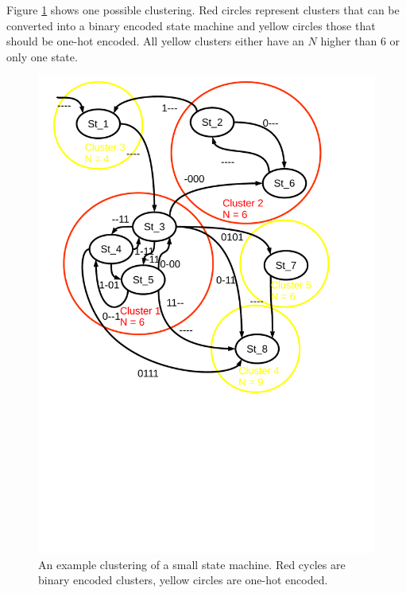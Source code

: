 Figure \ref{img:state_chart} shows one possible clustering. Red circles represent clusters that can be converted into a binary encoded state machine and yellow circles those that should be one-hot encoded.
All yellow clusters either have an $N$ higher than 6 or only one state. \\

\begin{figure}[h]
	\centering
	\includegraphics[scale=0.65, trim=400 250 400 0] {images/state_chart.pdf}
	\caption{An example clustering of a small state machine. Red cycles are binary encoded clusters, yellow circles are one-hot encoded.}
	\label{img:state_chart}
\end{figure}

